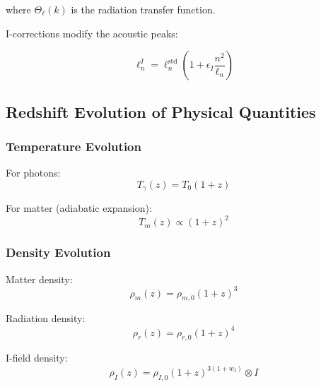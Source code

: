 where $\Theta_\ell(k)$ is the radiation transfer function.

I-corrections modify the acoustic peaks:

\begin{equation}
\label{eq:i_acoustic_peaks}
\ell_n^I = \ell_n^{\text{std}} \left(1 + \epsilon_I \frac{n^2}{\ell_n}\right)
\end{equation}

\subsection{Redshift Evolution of Physical Quantities}

\subsubsection{Temperature Evolution}

For photons:
\begin{equation}
\label{eq:photon_temperature}
T_\gamma(z) = T_0(1+z)
\end{equation}

For matter (adiabatic expansion):
\begin{equation}
\label{eq:matter_temperature}
T_m(z) \propto (1+z)^2
\end{equation}

\subsubsection{Density Evolution}

Matter density:
\begin{equation}
\label{eq:matter_density}
\rho_m(z) = \rho_{m,0}(1+z)^3
\end{equation}

Radiation density:
\begin{equation}
\label{eq:radiation_density}
\rho_r(z) = \rho_{r,0}(1+z)^4
\end{equation}

I-field density:
\begin{equation}
\label{eq:i_field_density}
\rho_I(z) = \rho_{I,0}(1+z)^{3(1+w_I)} \otimes I
\end{equation}
